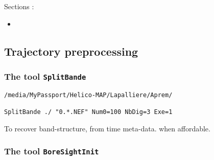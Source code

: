 Sections :

\begin{itemize}
   \item
\end{itemize}


\subsection{Trajectory preprocessing}

\subsubsection{The tool {\tt SplitBande}}


\begin{verbatim}
/media/MyPassport/Helico-MAP/Lapalliere/Aprem/

SplitBande ./ "0.*.NEF" Num0=100 NbDig=3 Exe=1
\end{verbatim}





To recover band-structure, from time meta-data. when affordable.


\subsubsection{The tool {\tt BoreSightInit}}











